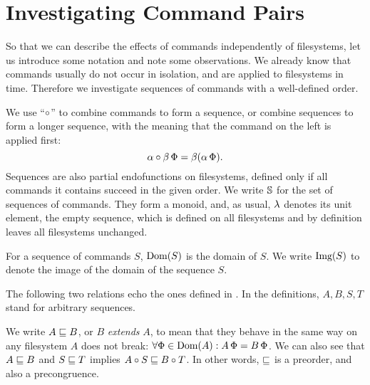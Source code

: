 

\section{Investigating Command Pairs}\label{section_axioms}


So that we can describe the effects of commands independently of filesystems,
let us introduce some notation
and note some observations.
We already know that
commands usually do not occur in isolation,
and are applied to filesystems in time.
Therefore we investigate sequences of commands with a well-defined order.
\begin{mydef}
We use ``$\circ$'' to combine commands to form a sequence, or combine sequences to form a longer sequence,
with the meaning that the command on the left is applied first:
\[ \alpha\circ\beta\,\Phi = \beta(\alpha\,\Phi). \]
Sequences are also partial endofunctions on filesystems, defined only if all commands it contains succeed in the given order.
We write $\mathbb{S}$ for the set of sequences of commands.
They form a monoid, and, as usual,
$\lambda$ denotes its unit element, the empty sequence,
which is defined on all filesystems and by definition leaves all filesystems unchanged.
\end{mydef}

\begin{mydef}
For a sequence of commands $S$, $\textrm{Dom}({S})$ is the domain of $S$.
We write $\textrm{Img}({S})$ to denote the image of the domain of the sequence $S$.
\end{mydef}


The following two relations 
echo the ones defined in \cite{NREC}.
In the definitions, $A,B,S,T$ stand for arbitrary sequences.

\begin{mydef}[$\eqext$]
We write $A\sqsubseteq B$, or $B$ \emph{extends} $A$,
to mean that they behave in the same way
on any filesystem $A$ does not break:
$\forall \Phi\in\textrm{Dom}({A}): A\,\Phi=B\,\Phi$.
We can also see that $A\sqsubseteq B$ and $S\sqsubseteq T$ implies $A\circ S\sqsubseteq B\circ T$.
In other words, $\eqext$ is a preorder, and also a precongruence.
\end{mydef}

